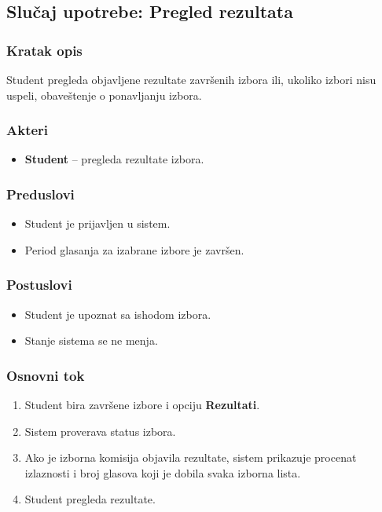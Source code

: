 \subsection{Slučaj upotrebe: Pregled rezultata}

\subsubsection*{Kratak opis}
Student pregleda objavljene rezultate završenih izbora ili, ukoliko izbori nisu uspeli, obaveštenje o ponavljanju izbora.

\subsubsection*{Akteri}
\begin{itemize}
    \item \textbf{Student} -- pregleda rezultate izbora.
\end{itemize}

\subsubsection*{Preduslovi}
\begin{itemize}
    \item Student je prijavljen u sistem.
    \item Period glasanja za izabrane izbore je završen.
\end{itemize}

\subsubsection*{Postuslovi}
\begin{itemize}
    \item Student je upoznat sa ishodom izbora.
    \item Stanje sistema se ne menja.
\end{itemize}

\subsubsection*{Osnovni tok}
\begin{enumerate}
    \item Student bira završene izbore i opciju \textbf{Rezultati}.
    \item Sistem proverava status izbora.
    \item Ako je izborna komisija objavila rezultate, sistem prikazuje procenat izlaznosti i broj glasova koji je dobila svaka izborna lista.
    \item Student pregleda rezultate.
\end{enumerate}

